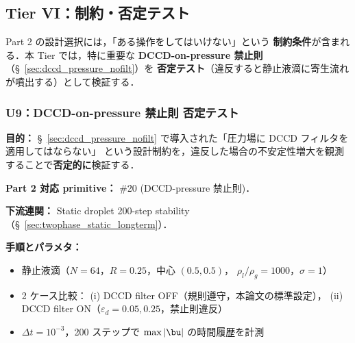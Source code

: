 %
\subsection{Tier VI：制約・否定テスト}
\label{sec:verify_constraint}

Part 2 の設計選択には，「ある操作をしてはいけない」という
\textbf{制約条件}が含まれる．本 Tier では，特に重要な
\textbf{DCCD-on-pressure 禁止則}（§~\ref{sec:dccd_pressure_nofilt}）を
\textbf{否定テスト}（違反すると静止液滴に寄生流れが噴出する）として検証する．

\subsubsection{U9：DCCD-on-pressure 禁止則 否定テスト}
\label{sec:U9_dccd_pressure_prohibition}

\noindent\textbf{目的：}
§~\ref{sec:dccd_pressure_nofilt} で導入された「圧力場に DCCD フィルタを適用してはならない」
という設計制約を，違反した場合の不安定性増大を観測することで\textbf{否定的に}検証する．

\noindent\textbf{Part 2 対応 primitive：} \#20 (DCCD-pressure 禁止則)．

\noindent\textbf{下流連関：}
Static droplet 200-step stability（§~\ref{sec:twophase_static_longterm}）．

\noindent\textbf{手順とパラメタ：}
\begin{itemize}[noitemsep]
  \item 静止液滴（$N = 64$，$R = 0.25$，中心 $(0.5, 0.5)$，
        $\rho_l/\rho_g = 1000$，$\sigma = 1$）
  \item 2 ケース比較：
        (i) DCCD filter OFF（規則遵守，本論文の標準設定），
        (ii) DCCD filter ON（$\varepsilon_d = 0.05, 0.25$，禁止則違反）
  \item $\Delta t = 10^{-3}$，200 ステップで $\max|\bu|$ の時間履歴を計測
\end{itemize}

